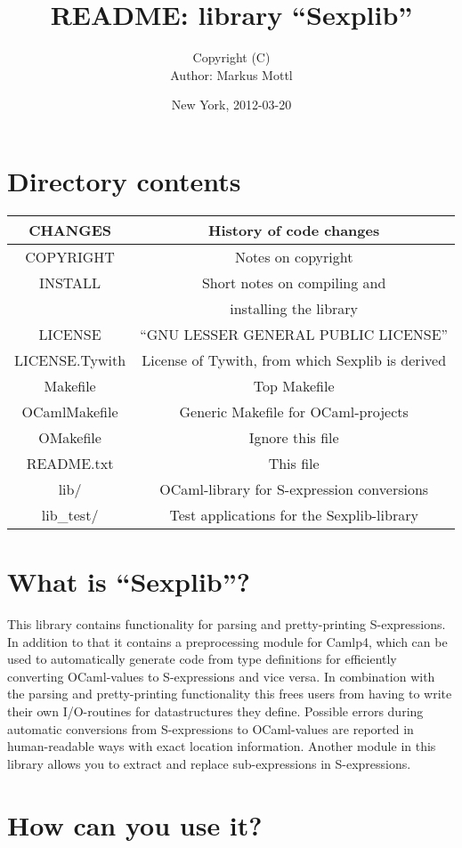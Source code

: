 \documentclass[a4paper]{article}
\title{README: library ``Sexplib''}
\author{
  Copyright \quad (C) \quad \theyear \quad \janeshort \quad\\
  Author: Markus Mottl
}
\date{New York, 2012-03-20}
\newcommand{\trow}[2]{\quad #1 \quad&\quad #2 \quad\\}
\newcommand{\trowl}[2]{\trow{#1}{#2}\hline}
\begin{document}
\maketitle
\section{Directory contents}
\begin{center}
\begin{tabular}{|c|c|}
\hline
\trowl{CHANGES}{History of code changes}
\trowl{COPYRIGHT}{Notes on copyright}
\trow{INSTALL}{Short notes on compiling and}
\trowl{}{installing the library}
\trowl{LICENSE}{``GNU LESSER GENERAL PUBLIC LICENSE''}
\trowl{LICENSE.Tywith}{License of Tywith, from which Sexplib is derived}
\trowl{Makefile}{Top Makefile}
\trowl{OCamlMakefile}{Generic Makefile for OCaml-projects}
\trowl{OMakefile}{Ignore this file}
\trowl{README.txt}{This file}
\trowl{lib/}{OCaml-library for S-expression conversions}
\trowl{lib\_test/}{Test applications for the Sexplib-library}
\end{tabular}
\end{center}

\section{What is ``Sexplib''?}

This library contains functionality for parsing and pretty-printing
S-expressions.  In addition to that it contains a preprocessing module for
Camlp4, which can be used to automatically generate code from type definitions
for efficiently converting OCaml-values to S-expressions and vice versa.
In combination with the parsing and pretty-printing functionality this frees
users from having to write their own I/O-routines for datastructures they
define.  Possible errors during automatic conversions from S-expressions
to OCaml-values are reported in human-readable ways with exact location
information.  Another module in this library allows you to extract and
replace sub-expressions in S-expressions.

\section{How can you use it?}
\end{document}
